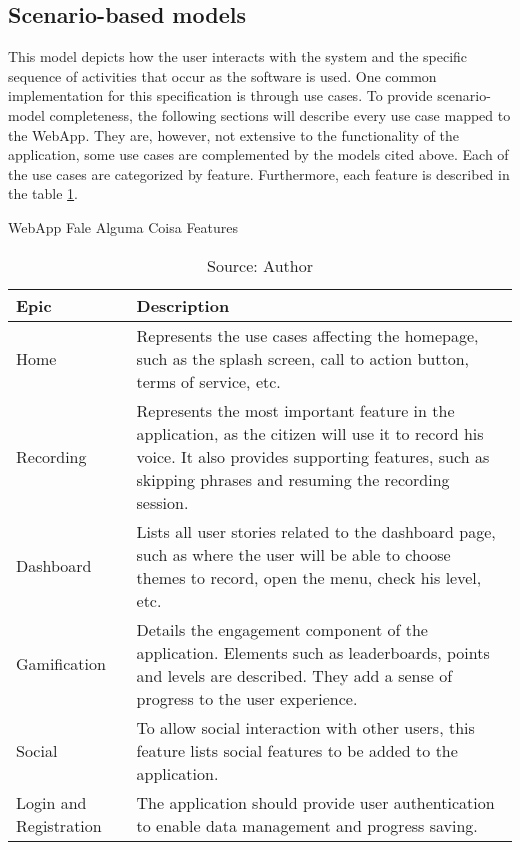 \subsection{Scenario-based models}

This model depicts how the user interacts with the system and the specific sequence of activities that occur as the software is used. One common implementation for this specification is through use cases. To provide scenario-model completeness, the following sections will describe every use case mapped to the WebApp. They are, however, not extensive to the functionality of the application, some use cases are complemented by the models cited above. Each of the use cases are categorized by feature. Furthermore, each feature is described in the table \ref{tab:falealgumacoisa-features}.

\begin{table}[h]
    \centering
    \caption{WebApp Fale Alguma Coisa Features}
    \label{tab:falealgumacoisa-features}
    \begin{tabular}{|p{3cm}|p{10cm}|}
        \hline Epic & Description \\
        \hline Home & Represents the use cases affecting the homepage, such as the splash screen, call to action button, terms of service, etc. \\
        \hline Recording & Represents the most important feature in the application, as the citizen will use it to record his voice. It also provides supporting features, such as skipping phrases and resuming the recording session.\\ 
        \hline Dashboard & Lists all user stories related to the dashboard page, such as where the user will be able to choose themes to record, open the menu, check his level, etc. \\
        \hline Gamification & Details the engagement component of the application. Elements such as leaderboards, points and levels are described. They add a sense of progress to the user experience. \\
        \hline Social & To allow social interaction with other users, this feature lists social features to be added to the application. \\
        \hline Login and Registration & The application should provide user authentication to enable data management and progress saving. \\
        \hline
    \end{tabular}
    \caption*{Source: Author}
\end{table}


